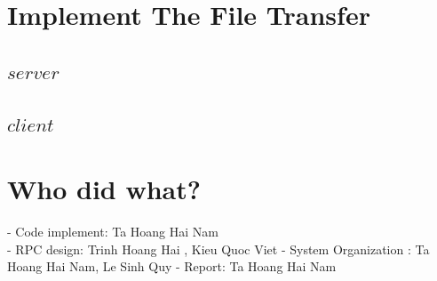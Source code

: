\documentclass[10pt,a4paper]{article}
\begin{document}
\section{Implement The File Transfer}
\subsection*{$server$}

\subsection*{$client$}


\section{Who did what?}
- Code implement: Ta Hoang Hai Nam\\
- RPC design: Trinh Hoang Hai , Kieu Quoc Viet
- System Organization : Ta Hoang Hai Nam, Le Sinh Quy
- Report: Ta Hoang Hai Nam
\end{document}

